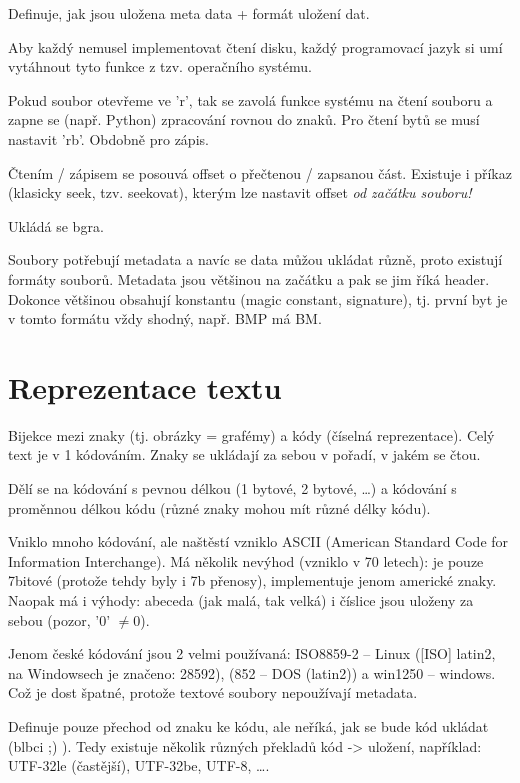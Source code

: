 \documentclass[12pt]{article}					%
\begin{document}
    \begin{definice}
        Definuje, jak jsou uložena meta data + formát uložení dat.

        Aby každý nemusel implementovat čtení disku, každý programovací jazyk si umí vytáhnout tyto funkce z tzv. operačního systému.
    \end{definice}

    \begin{definice}
        Pokud soubor otevřeme ve 'r', tak se zavolá funkce systému na čtení souboru a zapne se (např. Python) zpracování rovnou do znaků. Pro čtení bytů se musí nastavit 'rb'. Obdobně pro zápis.

        Čtením / zápisem se posouvá offset o přečtenou / zapsanou část. Existuje i příkaz (klasicky seek, tzv. seekovat), kterým lze nastavit offset \emph{od začátku souboru!}
    \end{definice}

    \begin{definice}[Obrázky]
        Ukládá se bgra.
    \end{definice}

    \begin{definice}
            Soubory potřebují metadata a navíc se data můžou ukládat různě, proto existují formáty souborů. Metadata jsou většinou na začátku a pak se jim říká header. Dokonce většinou obsahují konstantu (magic constant, signature), tj. první byt je v tomto formátu vždy shodný, např. BMP má BM.
    \end{definice}

\section{Reprezentace textu}
    \begin{definice}[Kódování]
        Bijekce mezi znaky (tj. obrázky = grafémy) a kódy (číselná reprezentace). Celý text je v 1 kódováním. Znaky se ukládají za sebou v pořadí, v jakém se čtou.

        Dělí se na kódování s pevnou délkou (1 bytové, 2 bytové, …) a kódování s proměnnou délkou kódu (různé znaky mohou mít různé délky kódu).

        Vniklo mnoho kódování, ale naštěstí vzniklo ASCII (American Standard Code for Information Interchange). Má několik nevýhod (vzniklo v 70 letech): je pouze 7bitové (protože tehdy byly i 7b přenosy), implementuje jenom americké znaky. Naopak má i výhody: abeceda (jak malá, tak velká) i číslice jsou uloženy za sebou (pozor, '0' $≠ 0$).

        Jenom české kódování jsou 2 velmi používaná: ISO8859-2 -- Linux ([ISO] latin2, na Windowsech je značeno: 28592), (852 -- DOS (latin2)) a win1250 -- windows. Což je dost špatné, protože textové soubory nepoužívají metadata.
    \end{definice}

    \begin{definice}[Unicode]
        Definuje pouze přechod od znaku ke kódu, ale neříká, jak se bude kód ukládat (blbci ;) ). Tedy existuje několik různých překladů kód -> uložení, například: UTF-32le (častější), UTF-32be, UTF-8, ….
    \end{definice}
\end{document}
